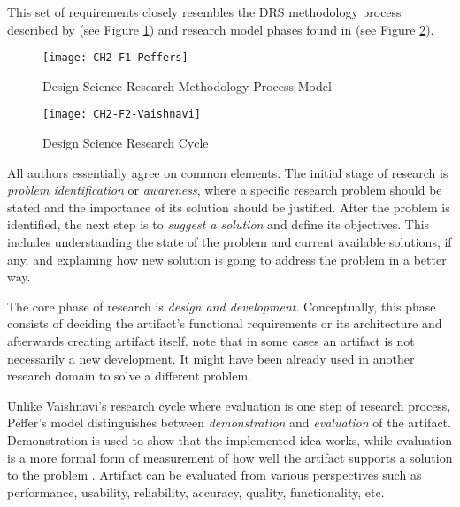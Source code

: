 This set of requirements closely resembles the DRS methodology process described
by \citet{Peffers2008} (see Figure \ref{fig:peffers}) and research model phases
found in \citet{Vaishnavi2007} (see Figure \ref{fig:vaishnavi}).

\begin{figure}[h!]
\centering
\texttt{[image: CH2-F1-Peffers]}
\caption[Design Science Research Methodology Process Model]{Design Science
Research Methodology Process Model \citep{Peffers2008}}
\label{fig:peffers}
\end{figure}

\FloatBarrier

\begin{figure}[htp]
\centering
\texttt{[image: CH2-F2-Vaishnavi]}
\caption[Design Science Research Cycle]{Design Science Research Cycle
\citep{Vaishnavi2007}}
\label{fig:vaishnavi}
\end{figure}

All authors essentially agree on common elements. The initial stage of research
is \textit{problem identification} or \textit{awareness}, where a specific
research problem should be stated and the importance of its solution should be
justified. After the problem is identified, the next step is to \textit{suggest
a solution} and define its objectives. This includes understanding the state of
the problem and current available solutions, if any, and explaining how new
solution is going to address the problem in a better way. 

\FloatBarrier

The core phase of research is \textit{design and development}. Conceptually,
this phase consists of deciding the artifact's functional requirements or its
architecture and afterwards creating artifact itself. \citet{Peffers2008} note
that in some cases an artifact is not necessarily a new development. It might
have been already used in another research domain to solve a different problem.

Unlike Vaishnavi's research cycle where evaluation is one step of research
process, Peffer's model distinguishes between \textit{demonstration} and
\textit{evaluation} of the artifact. Demonstration is used to show that the
implemented idea works, while evaluation is a more formal form of measurement of
how well the artifact supports a solution to the problem \citep{Peffers2008}.
Artifact can be evaluated from various perspectives such as performance,
usability, reliability, accuracy, quality, functionality, etc.

